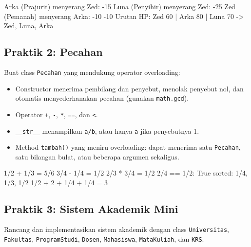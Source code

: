 \begin{keluaran}
Arka (Prajurit) menyerang Zed: -15
Luna (Penyihir) menyerang Zed: -25
Zed (Pemanah) menyerang Arka: -10 -10
Urutan HP: Zed 60 | Arka 80 | Luna 70 -> Zed, Luna, Arka
\end{keluaran}

\subsection{Praktik 2: Pecahan}

Buat class \texttt{Pecahan} yang mendukung operator overloading:

\begin{itemize}
  \item Constructor menerima pembilang dan penyebut, menolak penyebut nol, dan otomatis menyederhanakan pecahan (gunakan \texttt{math.gcd}).
  \item Operator \texttt{+}, \texttt{-}, \texttt{*}, \texttt{==}, dan \texttt{<}.
  \item \texttt{\_\_str\_\_} menampilkan \texttt{a/b}, atau hanya \texttt{a} jika penyebutnya 1.
  \item Method \texttt{tambah()} yang meniru overloading: dapat menerima satu \texttt{Pecahan}, satu bilangan bulat, atau beberapa argumen sekaligus.
\end{itemize}

\begin{keluaran}
1/2 + 1/3 = 5/6
3/4 - 1/4 = 1/2
2/3 * 3/4 = 1/2
2/4 == 1/2: True
sorted: 1/4, 1/3, 1/2
1/2 + 2 + 1/4 + 1/4 = 3
\end{keluaran}

\subsection{Praktik 3: Sistem Akademik Mini}

Rancang dan implementasikan sistem akademik dengan class \texttt{Universitas}, \texttt{Fakultas}, \texttt{ProgramStudi}, \texttt{Dosen}, \texttt{Mahasiswa}, \texttt{MataKuliah}, dan \texttt{KRS}.

